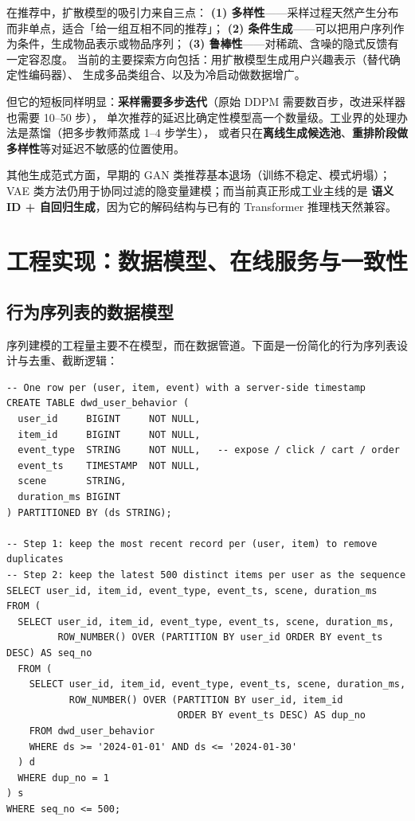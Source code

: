 在推荐中，扩散模型的吸引力来自三点：
\textbf{(1) 多样性}——采样过程天然产生分布而非单点，适合「给一组互相不同的推荐」；
\textbf{(2) 条件生成}——可以把用户序列作为条件，生成物品表示或物品序列；
\textbf{(3) 鲁棒性}——对稀疏、含噪的隐式反馈有一定容忍度。
当前的主要探索方向包括：用扩散模型生成用户兴趣表示（替代确定性编码器）、
生成多品类组合、以及为冷启动做数据增广。

但它的短板同样明显：\textbf{采样需要多步迭代}（原始 DDPM 需要数百步，改进采样器也需要 10--50 步），
单次推荐的延迟比确定性模型高一个数量级。工业界的处理办法是蒸馏（把多步教师蒸成 1--4 步学生），
或者只在\textbf{离线生成候选池}、\textbf{重排阶段做多样性}等对延迟不敏感的位置使用。

其他生成范式方面，早期的 GAN 类推荐基本退场（训练不稳定、模式坍塌）；
VAE 类方法仍用于协同过滤的隐变量建模；而当前真正形成工业主线的是
\textbf{语义 ID + 自回归生成}，因为它的解码结构与已有的 Transformer 推理栈天然兼容。

\section{工程实现：数据模型、在线服务与一致性}

\subsection{行为序列表的数据模型}

序列建模的工程量主要不在模型，而在数据管道。下面是一份简化的行为序列表设计与去重、截断逻辑：

\begin{lstlisting}[style=growth, language=SQLx, caption={用户行为序列表：去重与截断的典型写法（简化示意）}]
-- One row per (user, item, event) with a server-side timestamp
CREATE TABLE dwd_user_behavior (
  user_id     BIGINT     NOT NULL,
  item_id     BIGINT     NOT NULL,
  event_type  STRING     NOT NULL,   -- expose / click / cart / order
  event_ts    TIMESTAMP  NOT NULL,
  scene       STRING,
  duration_ms BIGINT
) PARTITIONED BY (ds STRING);

-- Step 1: keep the most recent record per (user, item) to remove duplicates
-- Step 2: keep the latest 500 distinct items per user as the sequence
SELECT user_id, item_id, event_type, event_ts, scene, duration_ms
FROM (
  SELECT user_id, item_id, event_type, event_ts, scene, duration_ms,
         ROW_NUMBER() OVER (PARTITION BY user_id ORDER BY event_ts DESC) AS seq_no
  FROM (
    SELECT user_id, item_id, event_type, event_ts, scene, duration_ms,
           ROW_NUMBER() OVER (PARTITION BY user_id, item_id
                              ORDER BY event_ts DESC) AS dup_no
    FROM dwd_user_behavior
    WHERE ds >= '2024-01-01' AND ds <= '2024-01-30'
  ) d
  WHERE dup_no = 1
) s
WHERE seq_no <= 500;
\end{lstlisting}


